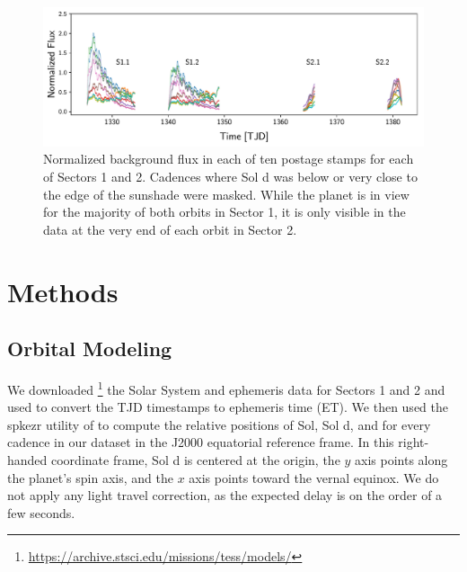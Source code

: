 \documentclass[modern]{aastex62}
\begin{document}
\begin{figure}[ht!]
    \begin{centering}
    \includegraphics[width=\linewidth]{figures/data.pdf}
    \caption{\label{fig:data}
             Normalized background flux in each of ten postage stamps
             for each of Sectors 1 and 2. Cadences where Sol d was
             below or very close to the edge of the sunshade were masked.
             While the planet is in view for the majority of both orbits
             in Sector 1, it is only visible in the data at the very end
             of each orbit in Sector 2.
             }
    \end{centering}
\end{figure}

\section{Methods}
\label{sec:methods}

\subsection{Orbital Modeling}
\label{sec:orbit}

We downloaded 
\footnote{\url{https://archive.stsci.edu/missions/tess/models/}}
the Solar System and \tess ephemeris data for
Sectors 1 and 2 and used \spiceypy \citep{Acton1996, Acton2017, Annex2017}
to convert the TJD timestamps to 
ephemeris time (ET). We then used the \textsf{spkezr} utility of \spiceypy to compute
the relative positions of Sol, Sol d, and \tess for every cadence
in our dataset in the J2000 equatorial reference frame. In this right-handed
coordinate frame, Sol d is centered at the origin, the $y$ axis points along the 
planet's spin axis, and the $x$ axis points toward the vernal equinox. We
do not apply any light travel correction, as the expected delay is on the order
of a few seconds.
\end{document}
